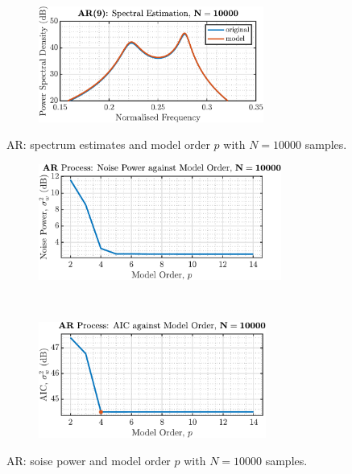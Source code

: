 \begin{enumerate}[label=\alph*), leftmargin=*]
\begin{figure}[h]
\begin{subfigure}{0.49\textwidth}
    \end{subfigure}
    ~
    \begin{subfigure}{0.49\textwidth}
        \centering
        \includegraphics[height=1.5in]{report/parametric-and-line-spectra/spectrum-of-autoregressive-processes/assets/c/ar_9}
    \end{subfigure}
    \caption{AR: spectrum estimates and model order $p$ with $N=10000$ samples.}
    \label{fig:2_2_c_1}
\end{figure}

\begin{figure}[h]
    \centering
    \begin{subfigure}{0.49\textwidth}
        \centering
        \includegraphics[height=1.5in]{report/parametric-and-line-spectra/spectrum-of-autoregressive-processes/assets/c/error}
    \end{subfigure}
    ~
    \begin{subfigure}{0.49\textwidth}
        \centering
        \includegraphics[height=1.5in]{report/parametric-and-line-spectra/spectrum-of-autoregressive-processes/assets/c/aic}
    \end{subfigure}
    \caption{AR: soise power and model order $p$ with $N=10000$ samples.}
    \label{fig:2_2_c_2}
\end{figure}

%
\end{enumerate}